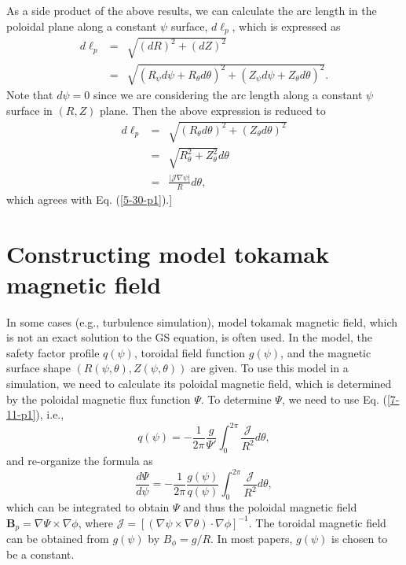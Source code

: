 \documentclass{llncs}
\begin{document}
As a side product of the above results, we can calculate the arc length in the
poloidal plane along a constant $\psi$ surface, $d \ell_p$, which is expressed
as
\begin{eqnarray*}
  d \ell_p & = & \sqrt{(d R)^2 + (d Z)^2}\\
  & = & \sqrt{(R_{\psi} d \psi + R_{\theta} d \theta)^2 + (Z_{\psi} d \psi +
  Z_{\theta} d \theta)^2} .
\end{eqnarray*}
Note that $d \psi = 0$ since we are considering the arc length along a
constant $\psi$ surface in $(R, Z)$ plane. Then the above expression is
reduced to
\begin{eqnarray}
  d \ell_p & = & \sqrt{(R_{\theta} d \theta)^2 + (Z_{\theta} d \theta)^2}
  \nonumber\\
  & = & \sqrt{R_{\theta}^2 + Z_{\theta}^2} d \theta \nonumber\\
  & = & \frac{|\mathcal{J} \nabla \psi |}{R} d \theta,  \label{6-8-e1}
\end{eqnarray}
which agrees with Eq. (\ref{5-30-p1}).]

\section{Constructing model tokamak magnetic field}

In some cases (e.g., turbulence simulation), model tokamak magnetic field,
which is not an exact solution to the GS equation, is often used. In the
model, the safety factor profile $q (\psi)$, toroidal field function $g
(\psi)$, and the magnetic surface shape $(R (\psi, \theta), Z (\psi, \theta))$
are given. To use this model in a simulation, we need to calculate its
poloidal magnetic field, which is determined by the poloidal magnetic flux
function $\Psi$. To determine $\Psi$, we need to use Eq. (\ref{7-11-p1}),
i.e.,
\begin{equation}
  q (\psi) = - \frac{1}{2 \pi}  \frac{g}{\Psi'} \int_0^{2 \pi}
  \frac{\mathcal{J}}{R^2} d \theta,
\end{equation}
and re-organize the formula as
\begin{equation}
  \frac{d \Psi}{d \psi} = - \frac{1}{2 \pi}  \frac{g (\psi)}{q (\psi)}
  \int_0^{2 \pi} \frac{\mathcal{J}}{R^2} d \theta,
\end{equation}
which can be integrated to obtain $\Psi$ and thus the poloidal magnetic field
$\mathbf{B}_p = \nabla \Psi \times \nabla \phi$, where $\mathcal{J} = [(\nabla
\psi \times \nabla \theta) \cdot \nabla \phi]^{- 1}$. The toroidal magnetic
field can be obtained from $g (\psi)$ by $B_{\phi} = g / R$. In most papers,
$g (\psi)$ is chosen to be a constant.
\end{document}
